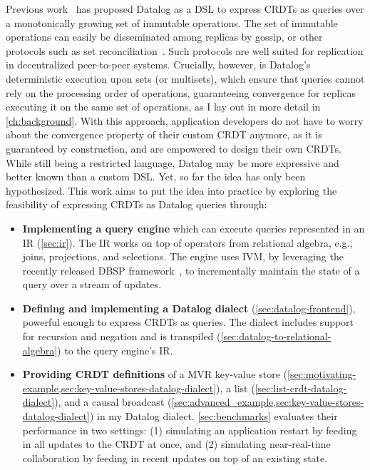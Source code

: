 Previous work~\cite{kleppmann2018data} has proposed Datalog as a \ac{DSL}
to express \acp{CRDT} as queries over a monotonically growing set of
immutable operations.
The set of immutable operations can easily be disseminated among replicas
by gossip, or other protocols such as set reconciliation~\cite{TODO}.
Such protocols are well suited for replication in decentralized peer-to-peer systems.
Crucially, however, is  Datalog's deterministic execution upon sets (or multisets),
which ensure that queries cannot rely on the processing order of operations,
guaranteeing convergence for replicas executing it on the same set of operations,
as I lay out in more detail in \autoref{ch:background}.
With this approach, application developers do not have to worry about
the convergence property of their custom \ac{CRDT} anymore,
as it is guaranteed by construction, and are empowered to design their own \acp{CRDT}.
While still being a restricted language, Datalog may be more expressive
and better known than a custom \ac{DSL}.
Yet, so far the idea has only been hypothesized.
This work aims to put the idea into practice by exploring the feasibility of
expressing \acp{CRDT} as Datalog queries through:

\begin{itemize}
	\item \textbf{Implementing a query engine} which can execute queries
	      represented in an \ac{IR} (\ref{sec:ir}).
	      The \ac{IR} works on top of operators from relational algebra, e.g.,
	      joins, projections, and selections.
	      The engine uses \ac{IVM}, by leveraging the recently released DBSP
	      framework~\cite{budiu2025dbsp}, to incrementally maintain the state
	      of a query over a stream of updates.
	\item \textbf{Defining and implementing a Datalog dialect} (\ref{sec:datalog-frontend}),
	      powerful enough to express \acp{CRDT} as queries.
	      The dialect includes support for recursion and negation
	      and is transpiled (\ref{sec:datalog-to-relational-algebra})
	      to the query engine's \ac{IR}.
	\item \textbf{Providing \ac{CRDT} definitions} of a \ac{MVR} key-value store
	      (\ref{sec:motivating-example,sec:key-value-stores-datalog-dialect}),
	      a list (\ref{sec:list-crdt-datalog-dialect}), and a causal broadcast
		  (\ref{sec:advanced_example,sec:key-value-stores-datalog-dialect})
		  in my Datalog dialect.
	      \ref{sec:benchmarks} evaluates their performance in two settings:
	      (1) simulating an application restart by feeding in all updates to
	      the \ac{CRDT} at once, and (2) simulating near-real-time collaboration
	      by feeding in recent updates on top of an existing state.
\end{itemize}

